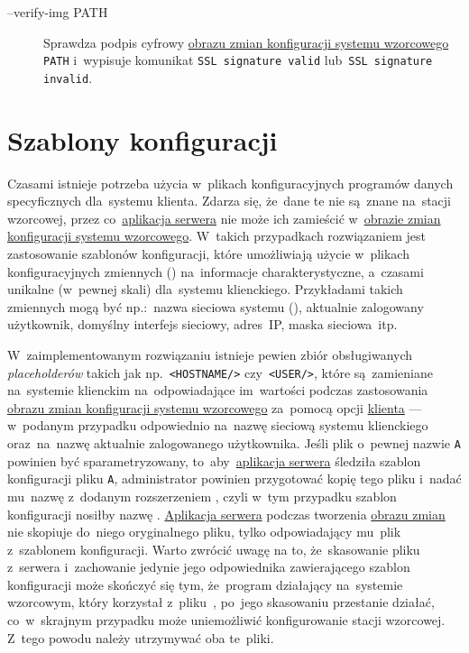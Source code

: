 \documentclass[thesis]{subfiles}
\begin{document}
\begin{description}
	\item[--verify-img {PATH}] Sprawdza podpis cyfrowy \hyperref[sec:obraz-zmian-konfiguracji]{obrazu zmian konfiguracji systemu wzorcowego} \texttt{PATH} i~wypisuje komunikat \texttt{SSL signature valid} lub~\texttt{SSL signature invalid}.
\end{description}


\section{Szablony konfiguracji}
\label{sec:szablony-konfiguracji}

Czasami istnieje potrzeba użycia w~plikach konfiguracyjnych programów danych specyficznych dla~systemu klienta. Zdarza się, że~dane te nie są~znane na~stacji wzorcowej, przez co~\hyperref[sec:srv-app]{aplikacja serwera} nie może ich zamieścić w~\hyperref[sec:obraz-zmian-konfiguracji]{obrazie zmian konfiguracji systemu wzorcowego}. W~takich przypadkach rozwiązaniem jest zastosowanie szablonów konfiguracji, które umożliwiają użycie w~plikach konfiguracyjnych zmiennych () na~informacje charakterystyczne, a~czasami unikalne (w~pewnej skali) dla~systemu klienckiego. Przykładami takich zmiennych  mogą być np.:~nazwa sieciowa systemu (), aktualnie zalogowany użytkownik, domyślny interfejs sieciowy, adres~IP, maska sieciowa~itp.

W~zaimplementowanym rozwiązaniu istnieje pewien zbiór obsługiwanych \emph{placeholderów} takich jak np.~\texttt{<HOSTNAME/>} czy~\texttt{<USER/>}, które są~zamieniane na~systemie klienckim na~odpowiadające im~wartości podczas zastosowania \hyperref[sec:obraz-zmian-konfiguracji]{obrazu zmian konfiguracji systemu wzorcowego} za~pomocą opcji \hyperref[sec:cli-app]{klienta}  --- w~podanym przypadku odpowiednio na~nazwę sieciową systemu klienckiego oraz~na~nazwę aktualnie zalogowanego użytkownika. Jeśli plik o~pewnej nazwie \texttt{A} powinien być sparametryzowany, to~aby~\hyperref[sec:srv-app]{aplikacja serwera} śledziła szablon konfiguracji pliku \texttt{A}, administrator powinien przygotować kopię tego pliku i~nadać mu~nazwę z~dodanym rozszerzeniem , czyli w~tym przypadku szablon konfiguracji nosiłby nazwę . \hyperref[sec:srv-app]{Aplikacja serwera} podczas tworzenia \hyperref[sec:obraz-zmian-konfiguracji]{obrazu zmian} nie skopiuje do~niego oryginalnego pliku, tylko odpowiadający mu~plik z~szablonem konfiguracji. Warto zwrócić uwagę na to, że~skasowanie pliku  z~serwera i~zachowanie jedynie jego odpowiednika zawierającego szablon konfiguracji może skończyć się tym, że~program działający na~systemie wzorcowym, który korzystał z~pliku~, po~jego skasowaniu przestanie działać, co~w~skrajnym przypadku może uniemożliwić konfigurowanie stacji wzorcowej. Z~tego powodu należy utrzymywać oba te~pliki.
\end{document}
